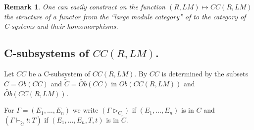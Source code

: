 \documentclass[11pt]{article}
\newtheorem{remark}[proposition]{Remark}
\newcommand{\llabel}[1]{\label{#1}}
\newcommand{\wt}{\widetilde}
\begin{document}
\begin{remark}\rm
\llabel{2014.09.28.rm1}
One can easily construct on the function $(R,LM)\mapsto CC(R,LM)$ the structure of a functor from the ``large module category'' of \cite{HM2008} to the category of C-systems and their homomorphisms.
\end{remark}
% 

\subsection{C-subsystems of $CC(R,LM)$.}
%
Let $CC$ be a C-subsystem of $CC(R,LM)$.  By \cite{Csubsystems} $CC$ is determined by the subsets $C=Ob(CC)$ and $\wt{C}=\wt{Ob}(CC)$ in $Ob(CC(R,LM))$ and $\wt{Ob}(CC(R,LM))$. 

For $\Gamma=(E_1,\dots,E_n)$ we write $(\Gamma\rhd_{C})$ if $(E_1,\dots,E_n)$ is in $C$ and $(\Gamma\vdash_{\wt{C}} t:T)$  if  $(E_1,\dots,E_n,T,t)$ is in $\wt{C}$. 
\end{document}

